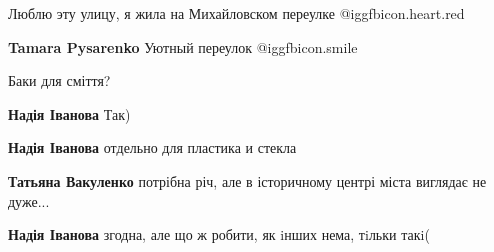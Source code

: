  
 
 
 
 

Люблю эту улицу, я жила на Михайловском переулке @igg{fbicon.heart.red}

\textbf{Tamara Pysarenko} Уютный переулок  @igg{fbicon.smile} 

Баки для сміття?

\textbf{Надія Іванова} Так)

\textbf{Надія Іванова} отдельно для пластика и стекла

\textbf{Татьяна Вакуленко} потрібна річ, але в історичному центрі міста виглядає не дуже...

\textbf{Надія Іванова} згодна, але що ж робити, як iнших нема, тiльки такi(

